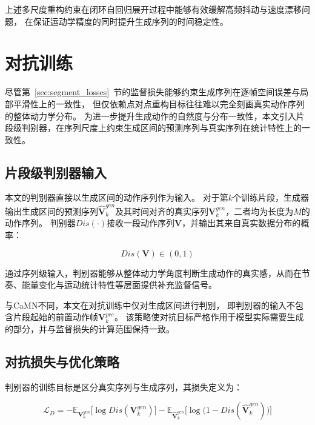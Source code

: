 上述多尺度重构约束在闭环自回归展开过程中能够有效缓解高频抖动与速度漂移问题，
在保证运动学精度的同时提升生成序列的时间稳定性。

\section{对抗训练}
\label{sec:adv_training}

尽管第~\ref{sec:segment_losses}~节的监督损失能够约束生成序列在逐帧空间误差与局部平滑性上的一致性，
但仅依赖点对点重构目标往往难以完全刻画真实动作序列的整体动力学分布。
为进一步提升生成动作的自然度与分布一致性，本文引入片段级判别器，在序列尺度上约束生成区间的预测序列与真实序列在统计特性上的一致性。

\subsection{片段级判别器输入}
\label{subsec:disc_input}

本文的判别器直接以生成区间的动作序列作为输入。
对于第$k$个训练片段，生成器输出生成区间的预测序列$\hat{\bm{V}}_k^{gen}$及其时间对齐的真实序列$\bm{V}_k^{gen}$，二者均为长度为$M$的动作序列。
判别器$Dis(\cdot)$接收一段动作序列$\bm{V}$，并输出其来自真实数据分布的概率：

\begin{equation}
Dis(\bm{V}) \in (0,1)
\end{equation}

通过序列级输入，判别器能够从整体动力学角度判断生成动作的真实感，从而在节奏、能量变化与运动统计特性等层面提供补充监督信号。

与CaMN\cite{beatcamn}不同，本文在对抗训练中仅对生成区间进行判别，
即判别器的输入不包含片段起始的前置动作帧$\bm{V}_k^{pre}$。
该策略使对抗目标严格作用于模型实际需要生成的部分，并与监督损失的计算范围保持一致。

\subsection{对抗损失与优化策略}
\label{subsec:bce_gan_loss}

判别器的训练目标是区分真实序列与生成序列，其损失定义为：

\begin{equation}
\mathcal{L}_{D} =
-\mathbb{E}_{\bm{V}_k^{gen}}\big[\log Dis(\bm{V}_k^{gen})\big]
-\mathbb{E}_{\hat{\bm{V}}_k^{gen}}\big[\log \big(1 - Dis(\hat{\bm{V}}_k^{gen})\big)\big]
\label{eq:disc_loss_bce}
\end{equation}

